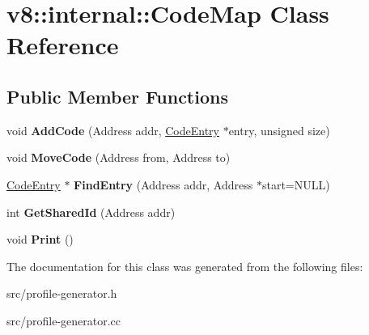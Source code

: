 \hypertarget{classv8_1_1internal_1_1_code_map}{}\section{v8\+:\+:internal\+:\+:Code\+Map Class Reference}
\label{classv8_1_1internal_1_1_code_map}
\subsection*{Public Member Functions}
\begin{DoxyCompactItemize}
\item 
\hypertarget{classv8_1_1internal_1_1_code_map_a09abba5047e41a0f239c14ac12e7dcb1}{}void {\bfseries Add\+Code} (Address addr, \hyperlink{classv8_1_1internal_1_1_code_entry}{Code\+Entry} $\ast$entry, unsigned size)\label{classv8_1_1internal_1_1_code_map_a09abba5047e41a0f239c14ac12e7dcb1}

\item 
\hypertarget{classv8_1_1internal_1_1_code_map_a9f88e4c00aa5ff6288414fbdfcad9372}{}void {\bfseries Move\+Code} (Address from, Address to)\label{classv8_1_1internal_1_1_code_map_a9f88e4c00aa5ff6288414fbdfcad9372}

\item 
\hypertarget{classv8_1_1internal_1_1_code_map_adff1728fc3c8408017a9d265e79bbe85}{}\hyperlink{classv8_1_1internal_1_1_code_entry}{Code\+Entry} $\ast$ {\bfseries Find\+Entry} (Address addr, Address $\ast$start=N\+U\+L\+L)\label{classv8_1_1internal_1_1_code_map_adff1728fc3c8408017a9d265e79bbe85}

\item 
\hypertarget{classv8_1_1internal_1_1_code_map_a656b435e8b25629135cdc857c4256fd9}{}int {\bfseries Get\+Shared\+Id} (Address addr)\label{classv8_1_1internal_1_1_code_map_a656b435e8b25629135cdc857c4256fd9}

\item 
\hypertarget{classv8_1_1internal_1_1_code_map_a452c676567eb04e227bd0ee4ba1a090d}{}void {\bfseries Print} ()\label{classv8_1_1internal_1_1_code_map_a452c676567eb04e227bd0ee4ba1a090d}

\end{DoxyCompactItemize}


The documentation for this class was generated from the following files\+:\begin{DoxyCompactItemize}
\item 
src/profile-\/generator.\+h\item 
src/profile-\/generator.\+cc\end{DoxyCompactItemize}
